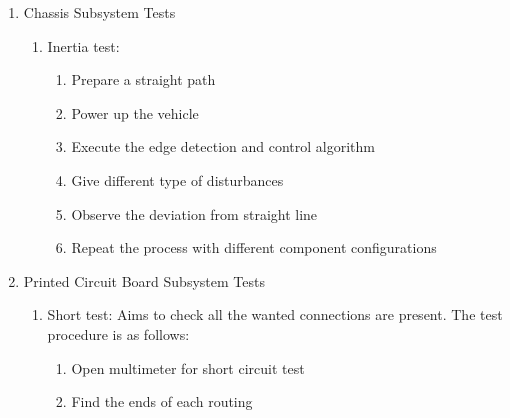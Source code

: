 \documentclass[a4paper,12pt]{article}
\begin{document}
\begin{enumerate}
\begin{enumerate}
\begin{enumerate}
\end{enumerate}

\end{enumerate}










\item {Chassis Subsystem Tests}

\begin{enumerate}

\item Inertia test: 

\begin{enumerate}

\item Prepare a straight path

\item Power up the vehicle 

\item Execute the edge detection and control algorithm

\item Give different type of disturbances 

\item Observe the deviation from straight line

\item Repeat the process with different component configurations

\end{enumerate} 

\end{enumerate}








\item {Printed Circuit Board Subsystem Tests}


\begin{enumerate}

\item Short test: Aims to check all the wanted connections are present. The test procedure is as follows:

\begin{enumerate} 

\item Open multimeter for short circuit test  

\item Find the ends of each routing 


\end{enumerate}
\end{enumerate}
\end{enumerate}
\end{document}
